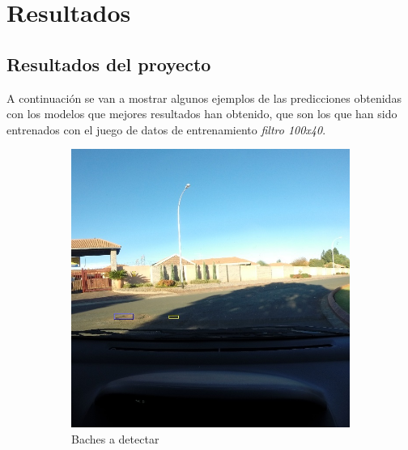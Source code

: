 \section{Resultados}
\label{sec:resultados}

\subsection{Resultados del proyecto}

A continuación se van a mostrar algunos ejemplos de las predicciones obtenidas con los modelos que mejores resultados han obtenido, que son los que han sido entrenados con el juego de datos de entrenamiento \textit{filtro 100x40}.

\begin{figure}[H]
	\centering
	\begin{subfigure}[h]{0.45\linewidth}
		\includegraphics[width=\linewidth]{images/results_a_gt.jpg}
		\caption{Baches a detectar}
	\end{subfigure}
	\begin{subfigure}[h]{0.45\linewidth}

\end{subfigure}
\end{figure}
